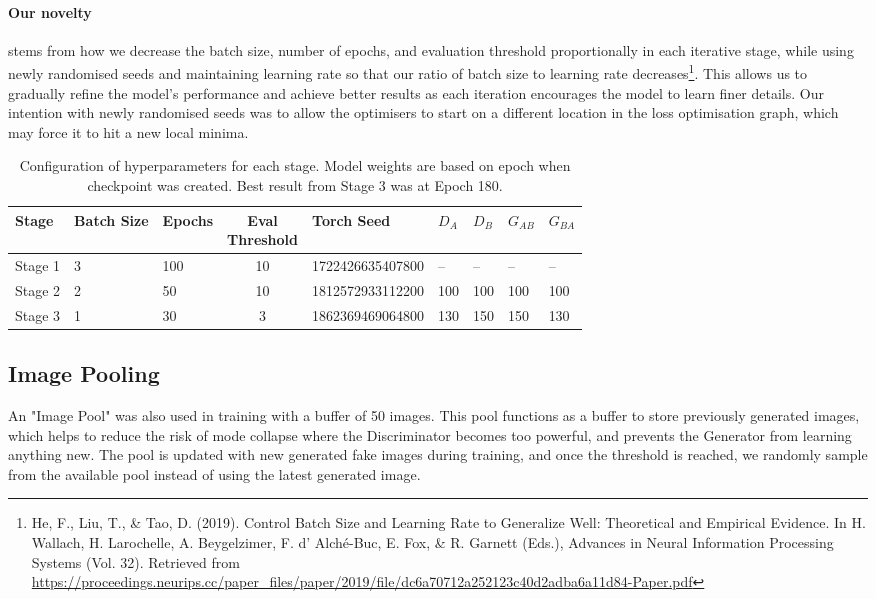 \documentclass[twoside,english,notitlepage]{report}
\begin{document}
\paragraph*{\noindent Our novelty}stems from how we decrease the batch size, number of epochs, and evaluation threshold proportionally in each iterative stage, while using newly randomised seeds and maintaining learning rate so that our ratio of batch size to learning rate decreases\footnote{He, F., Liu, T., \& Tao, D. (2019). Control Batch Size and Learning Rate to Generalize Well: Theoretical and Empirical Evidence. In H. Wallach, H. Larochelle, A. Beygelzimer, F. d' Alché-Buc, E. Fox, \& R. Garnett (Eds.), Advances in Neural Information Processing Systems (Vol. 32). Retrieved from \\ \href{https://proceedings.neurips.cc/paper_files/paper/2019/file/dc6a70712a252123c40d2adba6a11d84-Paper.pdf}{https://proceedings.neurips.cc/paper\_files/paper/2019/file/dc6a70712a252123c40d2adba6a11d84-Paper.pdf}}. This allows us to gradually refine the model's performance and achieve better results as each iteration encourages the model to learn finer details. Our intention with newly randomised seeds was to allow the optimisers to start on a different location in the loss optimisation graph, which may force it to hit a new local minima. 

\begin{table}[h]
    \centering
    \begin{tabular}{|l|l|l|c|l|l|l|l|l|}
    \hline
    \textbf{Stage} & \textbf{Batch Size} & \textbf{Epochs} & \makecell{\textbf{Eval} \\ \textbf{Threshold}} & \textbf{Torch Seed} & \textbf{$D_A$} & \textbf{$D_B$} & \textbf{$G_{AB}$} & {$G_{BA}$} \\
    \hline
    Stage 1 & 3 & 100 & 10 & 1722426635407800 & -- & -- & -- & -- \\
    Stage 2 & 2 & 50  & 10 & 1812572933112200 & 100 & 100 & 100 & 100 \\
    Stage 3 & 1 & 30  & 3  & 1862369469064800 & 130 & 150 & 150 & 130 \\
    \hline
    \end{tabular}
    \caption{Configuration of hyperparameters for each stage. Model weights are based on epoch when checkpoint was created. Best result from Stage 3 was at Epoch 180.}
\end{table}

\newpage
\subsection{Image Pooling}\label{task1:image-pooling}
An "Image Pool" was also used in training with a buffer of 50 images. This pool functions as a buffer to store previously generated images, which helps to reduce the risk of mode collapse where the Discriminator becomes too powerful, and prevents the Generator from learning anything new. The pool is updated with new generated fake images during training, and once the threshold is reached, we randomly sample from the available pool instead of using the latest generated image. 
\end{document}
